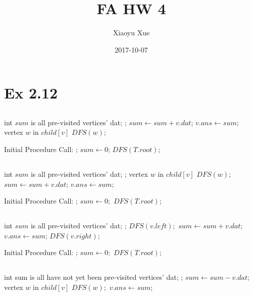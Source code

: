 

\title{FA HW 4}
\date{2017-10-07}
\author{Xiaoyu Xue}

\renewcommand{\thesubsection}{\thesection.\alph{subsection}}
\renewcommand{\thesection}{\arabic{section}}


\maketitle

\section{Ex 2.12}
\subsection{}
\Prog\qq
\Global int $sum$ is all pre-visited vertices' dat;\qq
{}; \p
$sum \leftarrow sum + v.dat$;\p
$v.ans \leftarrow sum$;\p
\Foreach vertex $w$ in $child[v]$ \Do\p
$DFS(w);$\p
\Endfor\qq
\Fini 

Initial Procedure Call:
\Prog\qq
{};\p
$sum \leftarrow 0$;\p
$DFS(T.root);$\qq
\Fini

\subsection{}
\Prog\qq
\Global int $sum$ is all pre-visited vertices' dat;\qq
{}; \p
\Foreach vertex $w$ in $child[v]$ \Do\p
$DFS(w);$\p
\Endfor\p
$sum \leftarrow sum + v.dat$;\p
$v.ans \leftarrow sum$;\qq
\Fini 

Initial Procedure Call:
\Prog\qq
{};\p
$sum \leftarrow 0;$\p
$DFS(T.root);$\qq
\Fini

\subsection{}
\Prog\qq
\Global int $sum$ is all pre-visited vertices' dat;\qq
{}; \p
$DFS(v.left);$\p
$sum \leftarrow sum + v.dat$;\p
$v.ans \leftarrow sum$;\p
$DFS(v.right);$\qq
\Fini 

Initial Procedure Call:
\Prog\qq
{};\p
$sum \leftarrow 0;$\p
$DFS(T.root);$\qq
\Fini


\subsection{}
\Prog\qq
\Global int sum is all have not yet been pre-visited vertices' dat;\qq
{}; \p
$sum \leftarrow sum - v.dat$;\p
\Foreach vertex $w$ in $child[v]$ \Do\p
$DFS(w);$\p
\Endfor\p
$v.ans \leftarrow sum$;\qq
\Fini 

